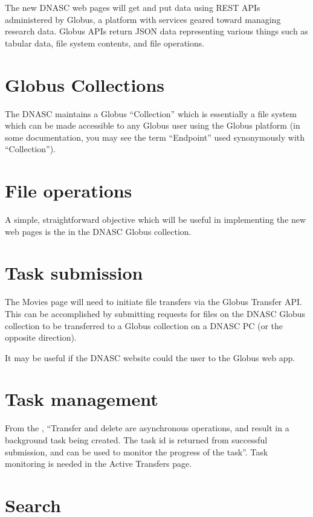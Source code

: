 
The new DNASC web pages will get and put data using REST APIs administered by Globus, 
a platform with services geared toward managing research data. Globus APIs return JSON 
data representing various things such as tabular data, file system contents, and file 
operations.
\section{Globus Collections}
The DNASC maintains a Globus ``Collection'' which is essentially a file system which 
can be made accessible to any Globus user using the Globus platform (in some documentation, 
you may see the term ``Endpoint'' used synonymously with ``Collection'').

\section{File operations}
A simple, straightforward objective which will be useful in implementing the new web 
pages is the  in the DNASC Globus collection.

\section{Task submission}
The Movies page will need to initiate file transfers via the Globus Transfer API. This 
can be accomplished by submitting requests for files on the DNASC Globus collection 
to be transferred to a Globus collection on a DNASC PC (or the opposite direction).

It may be useful if the DNASC website could  the user 
to the Globus web app.

\section{Task management}
From the , ``Transfer and delete are asynchronous 
operations, and result in a background task being created. The task id is returned from 
successful submission, and can be used to monitor the progress of the task''. Task 
monitoring is needed in the Active Transfers page.

\section{Search}

